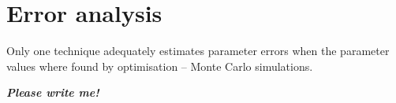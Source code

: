 



\section{Error analysis}

Only one technique adequately estimates parameter errors when the parameter values where found by optimisation -- Monte Carlo simulations.

\textbf{\textit{Please write me!}}

